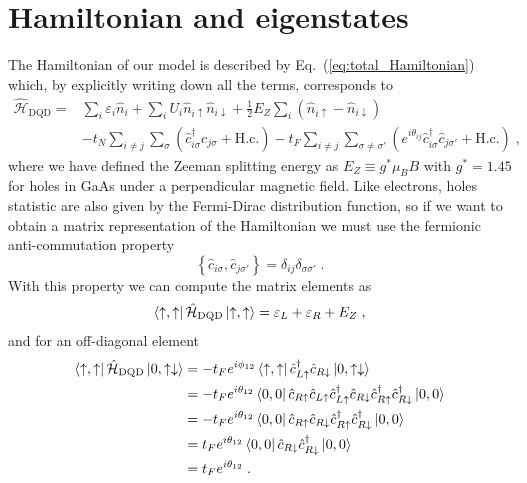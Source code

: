 \section{Hamiltonian and eigenstates}
The Hamiltonian of our model is described by Eq.~(\ref{eq:total_Hamiltonian}) which, by explicitly writing down all the terms, corresponds to
\begin{equation}
	\begin{split}
	\hat{\mathcal{H}}_{\text{DQD}}=&\sum_{i}\varepsilon_i\hat{n}_i+\sum_{i}U_i\hat{n}_{i\uparrow}\hat{n}_{i\downarrow}+\frac{1}{2}E_Z\sum_i(\hat{n}_{i\uparrow}-\hat{n}_{i\downarrow})\\
	&-t_N\sum_{i\neq j}\sum_{\sigma}\left(\hat{c}_{i\sigma}^\dagger c_{j\sigma}+\text{H.c.}\right)-t_F\sum_{i\neq j}\sum_{\sigma\neq \sigma'}\left(e^{i\theta_{ij}}\hat{c}_{i\sigma}^\dagger\hat{c}_{j\sigma'}+\text{H.c.}\right)\; ,
	\end{split}
\end{equation}
where we have defined the Zeeman splitting energy as $E_Z\equiv g^*\mu_B B$ with $g^*=1.45$ \cite{Bogan2017} for holes in GaAs under a perpendicular magnetic field. Like electrons, holes statistic are also given by the Fermi-Dirac distribution function, so if we want to obtain a matrix representation of the Hamiltonian we must use the fermionic anti-commutation property
\begin{equation}
\left\{\hat{c}_{i\sigma},\hat{c}_{j\sigma'}\right\}=\delta_{ij}\delta_{\sigma\sigma'}\; .
\end{equation}
With this property we can compute the matrix elements as
\begin{equation}
	\begin{split}
	\bra{\uparrow,\uparrow}\hat{\mathcal{H}}_{\text{DQD}}\ket{\uparrow,\uparrow}=\varepsilon_L+\varepsilon_R+E_Z\; ,
	\end{split}
\end{equation}
and for an off-diagonal element
\begin{equation}
	\begin{split}
	\bra{\uparrow,\uparrow}\hat{\mathcal{H}}_{\text{DQD}}\ket{0,\uparrow\downarrow}&=-t_Fe^{i\phi_{12}}\bra{\uparrow,\uparrow}\hat{c}_{L\uparrow}^\dagger\hat{c}_{R\downarrow}\ket{0,\uparrow\downarrow}\\
	&=-t_Fe^{i\theta_{12}}\bra{0,0}\hat{c}_{R\uparrow}\hat{c}_{L\uparrow}\hat{c}_{L\uparrow}^\dagger \hat{c}_{R\downarrow}\hat{c}_{R\uparrow}^\dagger\hat{c}_{R\downarrow}^\dagger\ket{0,0}\\
	&=-t_Fe^{i\theta_{12}}\bra{0,0}\hat{c}_{R\uparrow}\hat{c}_{R\downarrow}\hat{c}_{R\uparrow}^\dagger \hat{c}_{R\downarrow}^\dagger\ket{0,0}\\
	&=t_Fe^{i\theta_{12}}\bra{0,0}\hat{c}_{R\downarrow} \hat{c}_{R\downarrow}^\dagger\ket{0,0}\\
	&=t_Fe^{i\theta_{12}} \; .
	\end{split}
\end{equation}
